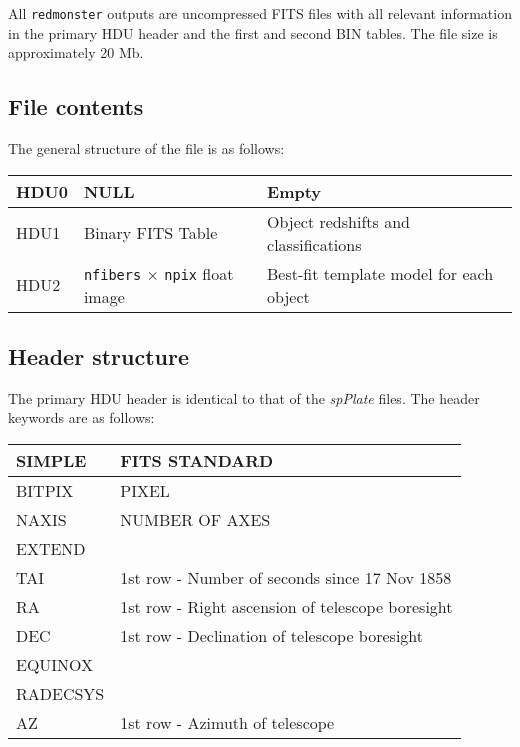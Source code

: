 \documentclass[12pt]{article}
\begin{document}
All \texttt{redmonster} outputs are uncompressed FITS
files with all relevant information in the primary HDU header and the first and second
BIN tables.  The file size is approximately 20 Mb.

\subsection{File contents}

The general structure of the file is as follows:

\begin{center}
	\begin{tabular}{ | l | l | l |}
	\hline
	HDU0 & NULL & Empty \\ \hline
	HDU1 & Binary FITS Table & Object redshifts and classifications \\ \hline
	HDU2 & \texttt{nfibers} $\times$ \texttt{npix} float image & Best-fit template model for each object \\
	\hline
	\end{tabular}
\end{center}

\subsection{Header structure}

The primary HDU header is identical to that of the \textit{spPlate} files.
The header keywords are as follows:

\begin{center}
	\begin{tabular}{ | l | l | }
	\hline
	SIMPLE & FITS STANDARD \\ \hline
	BITPIX & PIXEL \\ \hline
	NAXIS & NUMBER OF AXES \\ \hline
	EXTEND & \\ \hline
	TAI & 1st row - Number of seconds since 17 Nov 1858 \\ \hline
	RA & 1st row - Right ascension of telescope boresight \\ \hline
	DEC & 1st row - Declination of telescope boresight \\ \hline
	EQUINOX & \\ \hline
	RADECSYS & \\ \hline
	AZ & 1st row - Azimuth of telescope \\
	\hline
	\end{tabular}
\end{center}
\end{document}
